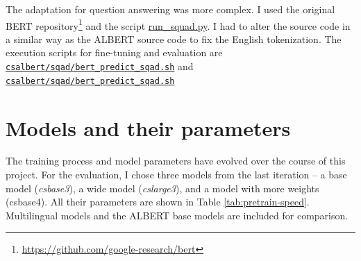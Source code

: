 \documentclass[
  printed, %
  color,   %
  table,   %
  oneside, %
  lof,     %
  lot,     %
]{fithesis3}
\begin{document}
The adaptation for question answering was more complex. I used the original BERT repository\footnote{\url{https://github.com/google-research/bert}} and the script \href{https://github.com/google-research/bert/blob/master/run_squad.py}{run\_squad.py}. I had to alter the source code in a similar way as the ALBERT source code to fix the English tokenization. The execution scripts for fine-tuning and evaluation are \href{https://github.com/ZepZep/csalbert/blob/master/sqad/bert_train_sqad.sh}
    {\texttt{csalbert/sqad/bert\_predict\_sqad.sh}} and 
\href{https://github.com/ZepZep/csalbert/blob/master/sqad/bert_train_sqad.sh}
    {\texttt{csalbert/\linebreak{}sqad/bert\_predict\_sqad.sh}}

\section{Models and their parameters}

The training process and model parameters have evolved over the course of this project. For the evaluation, I chose three models from the last iteration -- a base model (\textit{csbase3}), a wide model (\textit{cslarge3}), and a model with more weights (csbase4). All their parameters are shown in Table \ref{tab:pretrain-speed}. Multilingual models and the ALBERT base models are included for comparison.

\begin{table}[h]
\centering
\footnotesize
{}
\caption[Model parameters, size and speed]
{Model parameters, size, pretraining parameters and speed.}
\label{tab:pretrain-speed}
\end{table}
\end{document}
